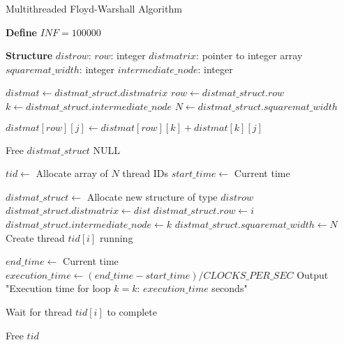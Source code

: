 \documentclass[11pt]{article}
\begin{document}
\begin{algorithm}
\caption{Multithreaded Floyd-Warshall Algorithm}
\begin{algorithmic}[1]

\State \textbf{Define} $INF = 100000$

\State \textbf{Structure} $distrow$:
\State \hspace{\algorithmicindent} $row$: integer
\State \hspace{\algorithmicindent} $distmatrix$: pointer to integer array
\State \hspace{\algorithmicindent} $squaremat\_width$: integer
\State \hspace{\algorithmicindent} $intermediate\_node$: integer

    \State $distmat \gets distmat\_struct.distmatrix$
    \State $row \gets distmat\_struct.row$
    \State $k \gets distmat\_struct.intermediate\_node$
    \State $N \gets distmat\_struct.squaremat\_width$
    
            \State $distmat[row][j] \gets distmat[row][k] + distmat[k][j]$
        \EndIf
    \EndFor
    
    \State Free $distmat\_struct$
    \State \Return NULL
\EndFunction

        \State $tid \gets$ Allocate array of $N$ thread IDs
        \State $start\_time \gets$ Current time
        
            \State $distmat\_struct \gets$ Allocate new structure of type $distrow$
            \State $distmat\_struct.distmatrix \gets dist$
            \State $distmat\_struct.row \gets i$
            \State $distmat\_struct.intermediate\_node \gets k$
            \State $distmat\_struct.squaremat\_width \gets N$
            \State Create thread $tid[i]$ running 
        \EndFor
        
        \State $end\_time \gets$ Current time
        \State $execution\_time \gets (end\_time - start\_time) / CLOCKS\_PER\_SEC$
        \State Output "Execution time for loop $k=k$: $execution\_time$ seconds"
        
            \State Wait for thread $tid[i]$ to complete
        \EndFor
        
        \State Free $tid$
    \EndFor
\EndFunction

\end{algorithmic}
\end{algorithm}
\end{document}
